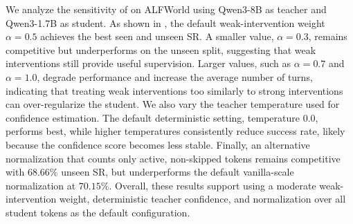 \begin{table}[t]
\centering
\caption{Sensitivity analysis on ALFWorld using Qwen3-8B as teacher and Qwen3-1.7B as student. The default configuration uses $\alpha=0.5$, teacher temperature $0.0$, and vanilla-scale normalization over all student tokens.}
\label{tab:sensitivity}
\end{table}

We analyze the sensitivity of \ours{} on ALFWorld using Qwen3-8B as teacher and Qwen3-1.7B as student.
%
As shown in , the default weak-intervention weight $\alpha=0.5$ achieves the best seen and unseen SR.
%
A smaller value, $\alpha=0.3$, remains competitive but underperforms on the unseen split, suggesting that weak interventions still provide useful supervision.
%
Larger values, such as $\alpha=0.7$ and $\alpha=1.0$, degrade performance and increase the average number of turns, indicating that treating weak interventions too similarly to strong interventions can over-regularize the student.
%
We also vary the teacher temperature used for confidence estimation.
%
The default deterministic setting, temperature $0.0$, performs best, while higher temperatures consistently reduce success rate, likely because the confidence score becomes less stable.
%
Finally, an alternative normalization that counts only active, non-skipped tokens remains competitive with $68.66\%$ unseen SR, but underperforms the default vanilla-scale normalization at $70.15\%$.
%
Overall, these results support using a moderate weak-intervention weight, deterministic teacher confidence, and normalization over all student tokens as the default configuration.

